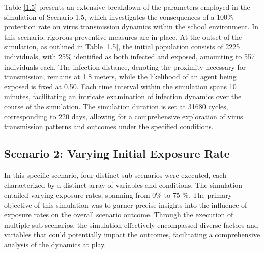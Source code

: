 Table \ref{1.5} presents an extensive breakdown of the parameters employed in the simulation of Scenario 1.5, which investigates the consequences of a 100\% protection rate on virus transmission dynamics within the school environment. In this scenario, rigorous preventive measures are in place. At the outset of the simulation, as outlined in Table \ref{1.5}, the initial population consists of 2225 individuals, with 25\% identified as both infected and exposed, amounting to 557 individuals each. The infection distance, denoting the proximity necessary for transmission, remains at 1.8 meters, while the likelihood of an agent being exposed is fixed at 0.50. Each time interval within the simulation spans 10 minutes, facilitating an intricate examination of infection dynamics over the course of the simulation. The simulation duration is set at 31680 cycles, corresponding to 220 days, allowing for a comprehensive exploration of virus transmission patterns and outcomes under the specified conditions.

\subsection{ Scenario 2: Varying Initial Exposure Rate}
In this specific scenario, four distinct sub-scenarios were executed, each characterized by a distinct array of variables and conditions. The simulation entailed varying exposure rates, spanning from 0\% to 75                                                                                                                                       \%. The primary objective of this simulation was to garner precise insights into the influence of exposure rates on the overall scenario outcome. Through the execution of multiple sub-scenarios, the simulation effectively encompassed diverse factors and variables that could potentially impact the outcomes, facilitating a comprehensive analysis of the dynamics at play.

